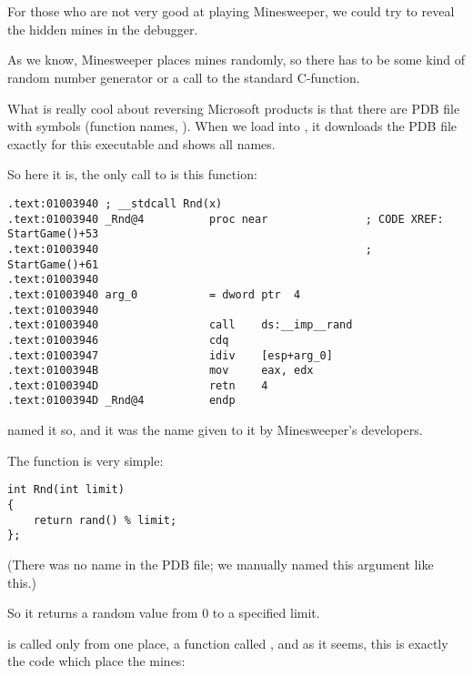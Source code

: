 \section{\MinesweeperWinXPExampleChapterName}
\label{minesweeper_winxp}

For those who are not very good at playing Minesweeper, we could try to reveal the hidden mines in the debugger.


As we know, Minesweeper places mines randomly, so there has to be some kind of random number generator or
a call to the standard  C-function.

What is really cool about reversing Microsoft products is that there are \gls{PDB} 
file with symbols (function names, \etc{}).
When we load  into \IDA, it downloads the 
\gls{PDB} file exactly for this 
executable and shows all names.

So here it is, the only call to  is this function:

\begin{lstlisting}
.text:01003940 ; __stdcall Rnd(x)
.text:01003940 _Rnd@4          proc near               ; CODE XREF: StartGame()+53
.text:01003940                                         ; StartGame()+61
.text:01003940
.text:01003940 arg_0           = dword ptr  4
.text:01003940
.text:01003940                 call    ds:__imp__rand
.text:01003946                 cdq
.text:01003947                 idiv    [esp+arg_0]
.text:0100394B                 mov     eax, edx
.text:0100394D                 retn    4
.text:0100394D _Rnd@4          endp
\end{lstlisting}

\IDA named it so, and it was the name given to it by Minesweeper's developers.

The function is very simple:

\begin{lstlisting}
int Rnd(int limit)
{
    return rand() % limit;
};
\end{lstlisting}

(There was no  name in the \gls{PDB} file; we manually named this argument like this.)

So it returns 
a random value from 0 to a specified limit.

 is called only from one place, 
a function called , 
and as it seems, this is exactly 
the code which place the mines:

